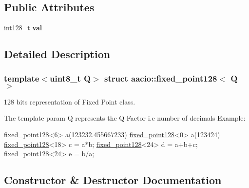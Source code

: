 \subsection*{Public Attributes}
\begin{DoxyCompactItemize}
\item 
\mbox{\label{structaacio_1_1fixed__point128_adf071e9b947f31fdb091f3eb42658b8b}} 
int128\+\_\+t {\bfseries val}
\end{DoxyCompactItemize}


\subsection{Detailed Description}
\subsubsection*{template$<$uint8\+\_\+t Q$>$\newline
struct aacio\+::fixed\+\_\+point128$<$ Q $>$}

128 bits representation of Fixed Point class. 

The template param Q represents the Q Factor i.\+e number of decimals Example\+: 
\begin{DoxyCode}
fixed\_point128<6> a(123232.455667233)
\mbox{\hyperlink{structaacio_1_1fixed__point128_a6e270112328d9350e6ea9383ae4f75d6}{fixed\_point128}}<0> a(123424)
\mbox{\hyperlink{structaacio_1_1fixed__point128_a6e270112328d9350e6ea9383ae4f75d6}{fixed\_point128}}<18> c = a*b;
\mbox{\hyperlink{structaacio_1_1fixed__point128_a6e270112328d9350e6ea9383ae4f75d6}{fixed\_point128}}<24> d = a+b+c;
\mbox{\hyperlink{structaacio_1_1fixed__point128_a6e270112328d9350e6ea9383ae4f75d6}{fixed\_point128}}<24> e = b/a;
\end{DoxyCode}
 

\subsection{Constructor \& Destructor Documentation}
\mbox{\label{structaacio_1_1fixed__point128_a6e270112328d9350e6ea9383ae4f75d6}} 
